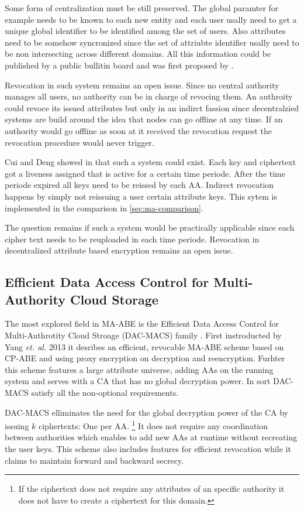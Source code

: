 Some form of centralization must be still preserved. The global paramter for example needs to be known to each new entity and each user usally need to get a unique global identifier to be identified among the set of users. Also attributes need to be somehow syncronized since the set of attriubte identifier usally need to be non intersecting across different domains. All this information could be published by a public bullitin board and was first proposed by \cite{lewko2011decentralizing}. 

Revocation in such system remains an open issue. Since no central authority manages all users, no authority can be in charge of revocing them. An authroity could revoce its issued attributes but only in an indirct fassion since decentralzied systems are build around the idea that nodes can go offline at any time. If an authority would go offline as soon at it received the revocation request the revocation procedure would never trigger. 

Cui and Deng showed in \cite{cui2016revocable} that such a system could exist. Each key and ciphertext got a liveness assigned that is active for a certain time periode. After the time periode expired all keys need to be reissed by each AA. Indirect revocation happens by simply not reissuing a user certain attribute keys. This sytem is implemented in the comparison in \ref{sec:ma-comparison}.

The question remains if such a system would be practically applicable since each cipher text needs to be reuploaded in each time periode. Revocation in decentralized attribute based encryption remains an open issue.

\subsection{Efficient Data Access Control for Multi-Authority Cloud Storage}
The most explored field in MA-ABE is the Efficient Data Access Control for Multi-Authrotity Cloud Stroage (DAC-MACS) family \cite{yang2013dac}. First instroducted by Yang \textit{et. al.} 2013 it desribes an efficient, revocable MA-ABE scheme based on CP-ABE and using proxy encryption on decryption and reencryption. Furhter this scheme features a large attribute universe, adding AAs on the running system and serves with a CA that has no global decryption power. In sort DAC-MACS satisfy all the non-optional requirements.

DAC-MACS elliminates the need for the global decryption power of the CA by issuing $k$ ciphertexts: One per AA. \footnote{If the ciphertext does not require any attributes of an specific authority it does not have to create a ciphertext for this domain.} It does not require any coordination between authorities which enables to add new AAs at runtime without recreating the user keys. This scheme also includes features for efficient revocation while it claims to maintain forward and backward secrecy.

